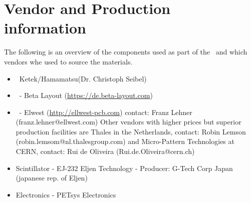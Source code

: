 \documentclass[../BTOF_summary.tex]{subfiles}
\begin{document}
\section{Vendor and Production information}

The following is an overview of the components used as part of the \btofD\ and which vendors whe used to source the materials.

\begin{itemize}
    \item \sipms\ Ketek/Hamamatsu(Dr. Christoph Seibel)
    \item \sensorboard\ - Beta Layout (\url{https://de.beta-layout.com})
    \item \railboard\ - Elwest (\url{http://ellwest-pcb.com}) contact: Franz Lehner (franz.lehner@ellwest.com)
    Other vendors with higher prices but superior production facilities are Thales in the Netherlands, contact: Robin Lemson (robin.lemsom@nl.thalesgroup.com) and Micro-Pattern Technologies at CERN, contact: Rui de Oliveira (Rui.de.Oliveira@cern.ch)
    \item Scintillator - EJ-232 Eljen Technology - Producer: G-Tech Corp Japan (japanese rep. of Eljen)
    \item Electronics - PETsys Electronics
\end{itemize}
\end{document}
